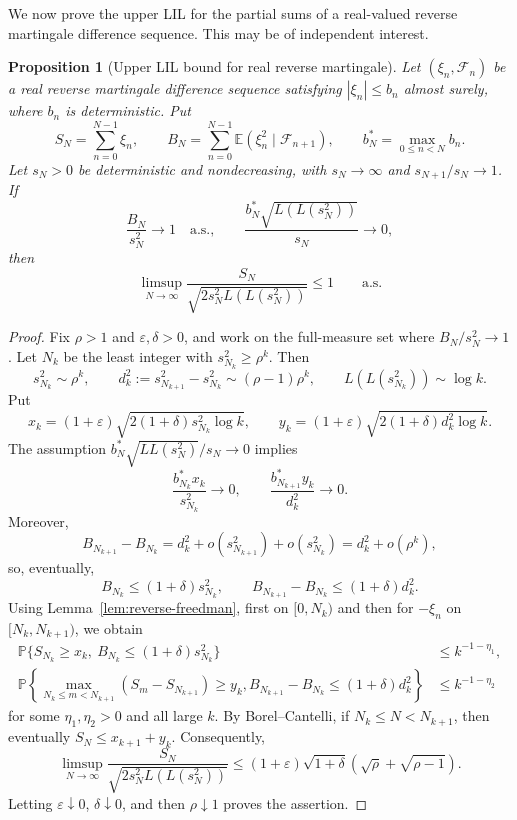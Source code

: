\documentclass[12pt, reqno, final, a4paper]{amsart}
\theoremstyle{plain}
\newtheorem{proposition}{Proposition}[section]
\theoremstyle{definition}
\theoremstyle{remark}
\newcommand{\E}{\mathbb E}
\newcommand{\1}{\mathbf 1}
\begin{document}
We now prove the upper LIL for the partial sums of a real-valued reverse martingale difference sequence. This may be of independent interest. 

\begin{proposition}[Upper LIL bound for real reverse martingale]
\label{lem:real-reverse-lil-upper}
Let $(\xi_n,\mathcal F_n)$ be a real reverse martingale difference sequence satisfying
$|\xi_n|\le b_n$ almost surely, where $b_n$ is deterministic. Put
\[
 S_N=\sum_{n=0}^{N-1}\xi_n,
 \qquad B_N=\sum_{n=0}^{N-1}\E(\xi_n^2\mid\mathcal F_{n+1}),
 \qquad b_N^*=\max_{0\le n<N}b_n.
\]
Let $s_N>0$ be deterministic and nondecreasing, with $s_N\to\infty$ and
$s_{N+1}/s_N\to1$. If
\[
 \frac{B_N}{s_N^2}\to1\quad\text{a.s.},
 \qquad
 \frac{b_N^*\sqrt{L(L(s_N^2))}}{s_N}\to0,
\]
then
\[
 \limsup_{N\to\infty}
 \frac{S_N}{\sqrt{2s_N^2L(L(s_N^2))}}\le1
 \qquad\text{a.s.}
\]
\end{proposition}
\begin{proof}
Fix $\rho>1$ and $\varepsilon,\delta>0$, and work on the full-measure set
where $B_N/s_N^2\to1$. Let $N_k$ be the least integer with
$s_{N_k}^2\ge\rho^k$. Then
\[
 s_{N_k}^2\sim\rho^k,
 \qquad d_k^2:=s_{N_{k+1}}^2-s_{N_k}^2\sim(\rho-1)\rho^k,
 \qquad L(L(s_{N_k}^2))\sim\log k.
\]
Put
\[
 x_k=(1+\varepsilon)\sqrt{2(1+\delta)s_{N_k}^2\log k},
 \qquad
 y_k=(1+\varepsilon)\sqrt{2(1+\delta)d_k^2\log k}.
\]
The assumption $b_N^{*}\sqrt{LL(s_N^2)}/s_N\to 0$ implies
\[
 \frac{b_{N_k}^*x_k}{s_{N_k}^2}\to 0,
 \qquad
 \frac{b_{N_{k+1}}^*y_k}{d_k^2}\to 0.
\]
Moreover,
\[
 B_{N_{k+1}}-B_{N_k}
 =d_k^2+o(s_{N_{k+1}}^2)+o(s_{N_k}^2)
 =d_k^2+o(\rho^k),
\]
so, eventually,
\[
 B_{N_k}\le(1+\delta)s_{N_k}^2,
 \qquad
 B_{N_{k+1}}-B_{N_k}\le(1+\delta)d_k^2.
\]
Using Lemma~\ref{lem:reverse-freedman}, first on $[0,N_k)$ and then for
$-\xi_n$ on $[N_k,N_{k+1})$, we obtain
\begin{align*}
 \mathbb P\{S_{N_k}\ge x_k,\ B_{N_k}\le(1+\delta)s_{N_k}^2\}
 &\le k^{-1-\eta_1},\\
 \mathbb P\left\{
 \max_{N_k\le m<N_{k+1}}(S_m-S_{N_{k+1}})\ge y_k,
 B_{N_{k+1}}-B_{N_k}\le(1+\delta)d_k^2
 \right\}
 &\le k^{-1-\eta_2}
\end{align*}
for some $\eta_1,\eta_2>0$ and all large $k$. By Borel--Cantelli, if
$N_k\le N<N_{k+1}$, then eventually
$S_N\le x_{k+1}+y_k$. Consequently,
\[
 \limsup_{N\to\infty}
 \frac{S_N}{\sqrt{2s_N^2L(L(s_N^2))}}
 \le(1+\varepsilon)\sqrt{1+\delta}
       (\sqrt\rho+\sqrt{\rho-1}).
\]
Letting $\varepsilon\downarrow0$, $\delta\downarrow0$, and then
$\rho\downarrow1$ proves the assertion.
\end{proof}
\end{document}

